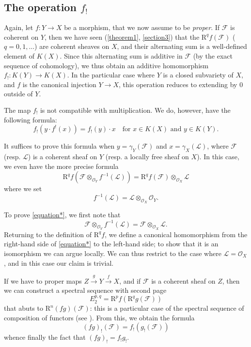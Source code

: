 \documentclass{article}
\theoremstyle{plain}
\theoremstyle{definition}
\newcommand{\sh}{\mathscr}
\newcommand{\RR}{\mathrm{R}}
\newcommand{\oldpage}[1]{\marginpar{\footnotesize$\Big\vert$ \textit{p.~#1}}}
\begin{document}
\subsection{The operation $f_!$}
\label{subsection5d}

Again, let $f\colon Y\to X$ be a morphism, that we now assume to be \emph{proper}.
If $\sh{F}$ is coherent on $Y$, then we have seen (\cref{theorem1}, \cref{section3}) that the $\RR^qf(\sh{F})$ ($q=0,1,\ldots$) are coherent sheaves on $X$, and their alternating sum is a well-defined element of $K(X)$.
Since this alternating sum is additive in $\sh{F}$ (by the exact sequence of cohomology), we thus obtain an additive homomorphism $f_!\colon K(Y)\to K(X)$.
In the particular case where $Y$ is a closed subvariety of $X$, and $f$ is the canonical injection $Y\to X$, this operation reduces to extending by $0$ outside of $Y$.

The map $f_!$ is not compatible with multiplication.
We do, however, have the following formula:
\[
  f_!(y\cdot f^!(x)) = f_!(y)\cdot x
  \quad
  \mbox{for $x\in K(X)$ and $y\in K(Y)$.}
\]

It suffices to prove this formula when $y=\gamma_Y(\sh{F})$ and $x=\gamma_X(\sh{L})$, where $\sh{F}$ (resp. $\sh{L}$) is a coherent sheaf on $Y$ (resp. a locally free sheaf on $X$).
In this case, we even have the more precise formula
\[
\label{equation*}
  \RR^qf(\sh{F}\otimes_{\sh{O}_Y}f^{-1}(\sh{L})) = \RR^qf(\sh{F})\otimes_{\sh{O}_X}\sh{L}
  \tag{$\star$}
\]
where we set
\[
  f^{-1}(\sh{L}) = \sh{L}\otimes_{\sh{O}_X}\sh{O}_Y.
\]

\oldpage{111}
To prove \cref{equation*}, we first note that
\[
  \sh{F}\otimes_{\sh{O}_Y}f^{-1}(\sh{L}) = \sh{F}\otimes_{\sh{O}_X}\sh{L}.
\]
Returning to the definition of $\RR^qf$, we define a canonical homomorphism from the right-hand side of \cref{equation*} to the left-hand side;
to show that it is an isomorphism we can argue locally.
We can thus restrict to the case where $\sh{L}=\sh{O}_X$, and in this case our claim is trivial.

If we have to proper maps $Z\xrightarrow{g}Y\xrightarrow{f}X$, and if $\sh{F}$ is a coherent sheaf on $Z$, then we can construct a spectral sequence with second page
\[
  E_2^{p,q} = \RR^pf(\RR^qg(\sh{F}))
\]
that abuts to $\RR^n(fg)(\sh{F})$:
this is a particular case of the spectral sequence of composition of functors (see \cite{7}).
From this, we obtain the formula
\[
  (fg)_!(\sh{F}) = f_!(g_!(\sh{F}))
\]
whence finally the fact that $(fg)_!=f_!g_!$.
\end{document}

